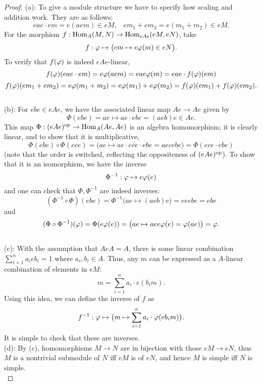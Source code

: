 \documentclass{amsart}
\begin{document}
\begin{proof}
	(a): To give a module structure we have to specify how scaling and addition work. They are as follows:
	$$
	eae \cdot em = e(aem) \in eM, \;\;\; em_1 + em_2 = e(m_1+m_2)\in eM.
	$$
	For the morphism $f:\operatorname{Hom}_A(M,N)\to \operatorname{Hom}_{eAe}(eM,eN)$, take
	$$
	f: \varphi \mapsto \big(em \mapsto e \varphi(m) \in eN\big).
	$$
	To verify that $f(\varphi)$ is indeed $eAe$-linear, 
	$$
	f(\varphi)(eae \cdot em) = e \varphi(aem) = eae \varphi(m) = eae\cdot  f(\varphi)(em)
	$$
	$$
	f(\varphi)(em_1 + em_2) = e\varphi(m_1+m_2) = e\varphi(m_1) + e\varphi(m_2)=f(\varphi)(em_1) + f(\varphi)(em_2).
	$$\\
	
	(b): For $ebe\in eAe$, we have the associated linear map $Ae\to Ae$ given by
	$$
	\Phi(ebe) = ae \mapsto ae \cdot ebe = (aeb)e \in Ae.
	$$
	This map $\Phi:(eAe)^{\rm{op}}\to \operatorname{Hom}_A(Ae,Ae)$ is an algebra homomorphism; it is clearly linear, and to show that it is multiplicative,
	$$
	\Phi(ebe) \circ \Phi(ece) = \big(ae \mapsto ae\cdot ece \cdot ebe = aecebe\big) = \Phi(ece \cdot ebe)
	$$
	(note that the order is switched, reflecting the oppositeness of $(eAe)^{\rm{op}}$).
	To show that it is an isomorphism, we have the inverse 
	$$
	\Phi^{-1}: \varphi \mapsto e\varphi(e)
	$$ 
	and one can check that $\Phi,\Phi^{-1}$ are indeed inverses:
	$$
	(\Phi^{-1}\circ \Phi)(ebe) = \Phi^{-1}\big(ae \mapsto (aeb)e\big) = eeebe = ebe
	$$
	and 
	$$
	(\Phi\circ \Phi^{-1})(\varphi) = \Phi(e\varphi(e)) = \big(ae \mapsto ae e\varphi(e) = \varphi(ae)\big) = \varphi.
	$$\\
	
	(c): With the assumption that $AeA=A$, there is some linear combination $\sum_{i=1}^n a_ieb_i = 1$ where $a_i,b_i\in A$. Thus, any $m$ can be expressed as a $A$-linear combination of elements in $eM$:
	$$
	m = \sum_{i=1}^n a_i\cdot e(b_im).
	$$
	Using this idea, we can define the inverse of $f$ as
	$$
	f^{-1}: \varphi \mapsto \big(m \mapsto \sum_{i=1}^na_i \cdot \varphi(eb_im)\big).
	$$
	It is simple to check that these are inverses.\\
	
	(d): By (c), homomorphisms $M\to N$ are in bijection with those $eM\to eN$, thus $M$ is a nontrivial submodule of $N$ iff $eM$ is of $eN$, and hence $M$ is simple iff $N$ is simple.\\
	
	
	
\end{proof}
	
\end{document}
